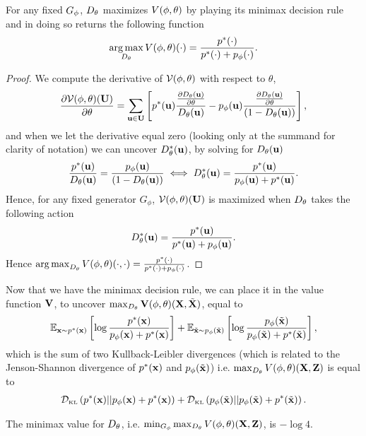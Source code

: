 \begin{theorem}%
 \label{theorem:minimax}
 For any fixed $G_\phi$, $D_\theta$ maximizes $V(\phi, \theta)$ by playing its minimax
 decision rule and in doing so returns the following function
  \begin{align}
    \operatorname*{arg\,max}_{D_\theta}V(\phi, \theta)(\cdot) = {p^*(\mathbf{\cdot}) \over p^*(\mathbf{\cdot}) + p_{\phi}(\mathbf{\cdot})}.
  \end{align}
\end{theorem}

\begin{proof}
  We compute the derivative of $\mathcal{V}(\phi, \theta)$ with respect to $\theta$,
  \begin{align}
    \label{eq:derivatives}
    {\partial \Va(\*U) \over \partial \theta} = \sum_{\*u \in \*U}\left[ \ptu { {\partial \D(\*u) \over \partial \theta} \over \D(\*u)} -
    \pgu {{\partial \D(\*u) \over \partial \theta} \over (1 - \D(\*u))}\right],
  \end{align}
  and when we let the derivative equal zero (looking only at the summand for
  clarity of notation) we can uncover $D_\theta^*(\mathbf{u})$, by solving for $D_\theta(\mathbf{u})$
  \begin{align}
    \label{eq:20}
    {\ptu \over \D(\*u)} = {\pgu \over (1 - \D(\*u))} \iff \D^*(\*u) = {\ptu \over \pgu + \ptu}.
  \end{align}
  Hence, for any fixed generator $G_\phi$, $\mathcal{V}(\phi, \theta)(\mathbf{U})$ is maximized when $D_\theta$ takes
  the following action
  \begin{align}
    \label{eq:13}
    \D^*(\*u) = \Dstar{u}.
  \end{align}
  Hence $\operatorname*{arg\,max}_{D_\theta}V(\phi, \theta)(\cdot, \cdot) = {p^*(\mathbf{\cdot}) \over p^*(\mathbf{\cdot}) + p_{\phi}(\mathbf{\cdot})}$.
\end{proof}

Now that we have the minimax decision rule, we can place it in the
value function $\mathbf{V}$, to uncover $\max_{D_\theta}\mathbf{V}(\phi, \theta)(\mathbf{X}, \tilde{\mathbf{X}})$,
equal to
\begin{align}
  \label{eq:sum-of-two-kl-divergences}
   \mathbb{E}_{\*x \sim \pt}\left[\log{{\pt \over p_{\phi}(\*x)+ \pt}}\right] + \mathbb{E}_{\tilde{\*x} \sim \pg}\left[\log{\pg \over \pg + p^*(\tilde{\*x})} \right],
\end{align}
which is the sum of two Kullback-Leibler divergences (which is related
to the Jenson-Shannon divergence of $p^*(\mathbf{x})$ and $p_{\phi}(\tilde{\mathbf{x}})$)
i.e. $\max_{D_\theta}V(\phi, \theta)(\mathbf{X}, \mathbf{Z})$ is equal to
\begin{align}
  \label{eq:16}
  \KL{\pt}{p_{\phi}(\*x) + \pt} + \KL{\pg}{\pg + p^*(\tilde{\*x})}.
\end{align}
\begin{lemma}
  The minimax value for $D_\theta$, i.e. $\min_{G_\phi}\max_{D_\theta}V(\phi, \theta)(\mathbf{X}, \mathbf{Z})$, is $ - \log{4}$.
\end{lemma}

